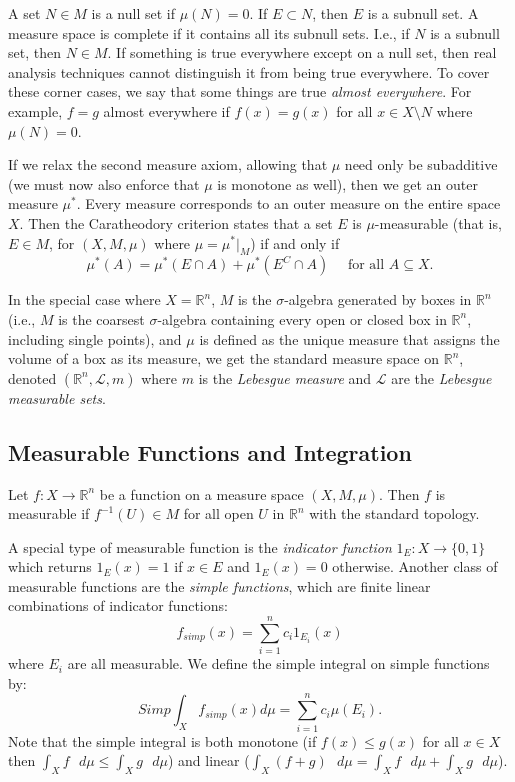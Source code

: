 \documentclass[12pt]{article}
\begin{document}
A set $N \in M$ is a null set if $\mu(N) = 0$.
If $E \subset N$, then $E$ is a subnull set.
A measure space is complete if it contains all its subnull sets.
I.e., if $N$ is a subnull set, then $N \in M$.
If something is true everywhere except on a null set, then real analysis 
techniques cannot distinguish it from being true everywhere.
To cover these corner cases, we say that some things are true 
{\it almost everywhere}.
For example, $f = g$ almost everywhere if $f(x) = g(x)$ for all 
$x \in X \setminus N$ where $\mu(N)=0$.

If we relax the second measure axiom, allowing that $\mu$ need only be
subadditive (we must now also enforce that $\mu$ is monotone as well), then
we get an outer measure $\mu^*$.
Every measure corresponds to an outer measure on the entire space $X$.
Then the Caratheodory criterion states that a set $E$ is $\mu$-measurable
(that is, $E \in M$, for $(X,M,\mu)$ where $\mu = \mu^*|_M$) if and only if
$$
\mu^*(A) = \mu^*(E \cap A) + \mu^*(E^C \cap A)
\quad\text{ for all $A \subseteq X$.}
$$

In the special case where $X = \mathbb{R}^n$, $M$ is the $\sigma$-algebra
generated by boxes in $\mathbb{R}^n$ (i.e., $M$ is the coarsest $\sigma$-algebra
containing every open or closed box in $\mathbb{R}^n$, including single points),
and $\mu$ is defined as the unique measure that assigns the volume of a box
as its measure, we get the standard measure space on $\mathbb{R}^n$,
denoted $(\mathbb{R}^n, \mathcal{L}, m)$ where $m$ is the {\it Lebesgue measure}
and $\mathcal{L}$ are the {\it Lebesgue measurable sets}.

\subsection*{Measurable Functions and Integration}

Let $f : X \rightarrow \mathbb{R}^n$ be a function on a measure space 
$(X,M,\mu)$.
Then $f$ is measurable if $f^{-1}(U) \in M$ for all open $U$ in $\mathbb{R}^n$ 
with the standard topology.

A special type of measurable function is the {\it indicator function} 
$1_E : X \rightarrow \{0,1\}$ which returns $1_E(x) = 1$ if $x\in E$ and 
$1_E(x) = 0$ otherwise.
Another class of measurable functions are the {\it simple functions}, which are 
finite linear combinations of indicator functions:
$$
f_{simp}(x) = \sum_{i=1}^n c_i 1_{E_i}(x)
$$
where $E_i$ are all measurable.
We define the simple integral on simple functions by:
$$
Simp \int_X f_{simp}(x) d\mu = \sum_{i=1}^n c_i \mu(E_i).
$$
Note that the simple integral is both monotone (if $f(x) \leq g(x)$ for all
$x \in X$ then $\int_X f\text{ }d\mu \leq \int_X g\text{ }d\mu$) and linear
($\int_X (f+g)\text{ }d\mu = \int_X f\text{ }d\mu + \int_X g\text{ }d\mu$).
\end{document}
